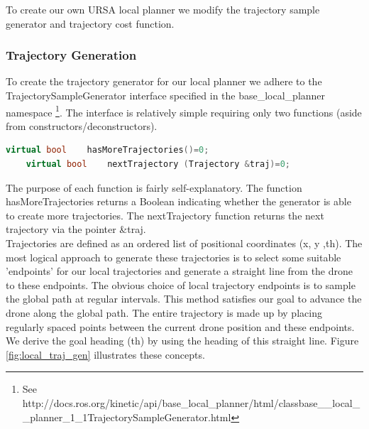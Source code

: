 \documentclass[capstone_report.tex]{subfiles}
\begin{document}
To create our own URSA local planner we modify the trajectory sample generator and trajectory cost function.\\

\subsubsection{Trajectory Generation} \label{sec: traj_gen}

To create the trajectory generator for our local planner we adhere to the TrajectorySampleGenerator interface specified in the base\_local\_planner namespace \footnote{See http://docs.ros.org/kinetic/api/base\_local\_planner/html/classbase\_\_local\_\_planner\_1\_1TrajectorySampleGenerator.html}.   The interface is relatively simple requiring only two functions (aside from constructors/deconstructors).

\begin{lstlisting}[language=c++]
    virtual bool    hasMoreTrajectories()=0;
    virtual bool    nextTrajectory (Trajectory &traj)=0;
\end{lstlisting}

The purpose of each function is fairly self-explanatory.  The function hasMoreTrajectories returns a Boolean indicating whether the generator is able to create more trajectories. The nextTrajectory function returns the next trajectory via the pointer \&traj.\\

Trajectories are defined as an ordered list of positional coordinates (x, y ,th).  The most logical approach to generate these trajectories is to select some suitable 'endpoints' for our local trajectories and generate a straight line from the drone to these endpoints.  The obvious choice of local trajectory endpoints is to sample the global path at regular intervals.  This method satisfies our goal to advance the drone along the global path.  The entire trajectory is made up by placing regularly spaced points between the current drone position and these endpoints.  We derive the goal heading (th) by using the heading of this straight line.  Figure \ref{fig:local_traj_gen} illustrates these concepts.
\end{document}
